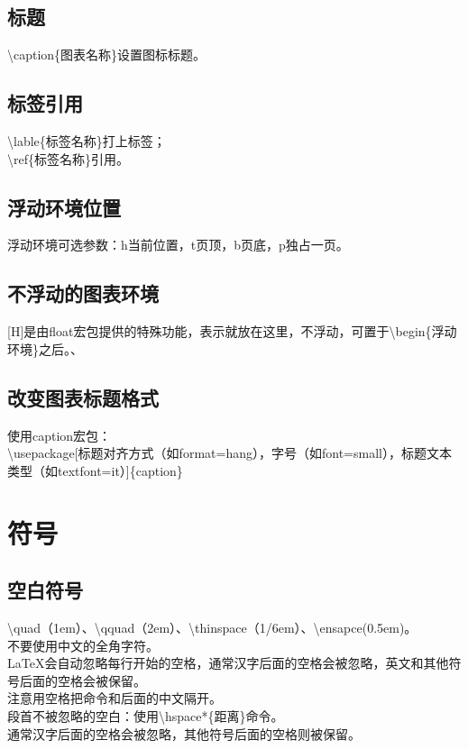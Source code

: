 \documentclass{book}%
\begin{document}
    \section{标题}
    \textbackslash caption\{图表名称\}设置图标标题。
    
    \section{标签引用}
    \textbackslash lable\{标签名称\}打上标签；\\
    \textbackslash ref\{标签名称\}引用。
    
    \section{浮动环境位置}
    浮动环境可选参数：h当前位置，t页顶，b页底，p独占一页。
    
    \section{不浮动的图表环境}
    [H]是由float宏包提供的特殊功能，表示就放在这里，不浮动，可置于\textbackslash begin\{浮动环境\}之后。、
    
    \section{改变图表标题格式}
    使用caption宏包：\\
    \textbackslash usepackage[标题对齐方式（如format=hang），字号（如font=small），标题文本类型（如textfont=it）]\{caption\}
    
    \chapter{符号}
    
    \section{空白符号}
    \textbackslash quad（1em）、\textbackslash qquad（2em）、\textbackslash thinspace（1/6em）、\textbackslash ensapce(0.5em)。\\
    不要使用中文的全角字符。\\
    \LaTeX 会自动忽略每行开始的空格，通常汉字后面的空格会被忽略，英文和其他符号后面的空格会被保留。\\
    注意用空格把命令和后面的中文隔开。\\
    段首不被忽略的空白：使用\textbackslash hspace*\{距离\}命令。\\
    通常汉字后面的空格会被忽略，其他符号后面的空格则被保留。\\
    
\end{document}
